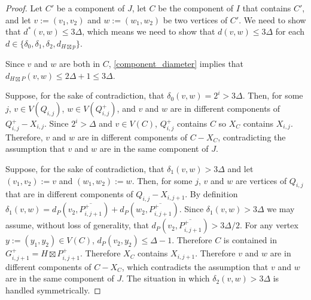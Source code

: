\documentclass{patmorin}
\renewcommand{\le}{\leqslant}
\begin{document}
\begin{proof}
  Let $C'$ be a component of $J$, let $C$ be the component of $I$ that contains $C'$, and let $v:=(v_1,v_2)$ and $w:=(w_1,w_2)$ be two vertices of $C'$. We need to show that $d^*(v,w)\le 3\Delta$, which means we need to show that $d(v,w)\le 3\Delta$ for each $d\in\{\delta_0, \delta_1,\delta_2,d_{H\boxtimes p}\}$.

  Since $v$ and $w$ are both in $C$, \cref{component_diameter} implies that $d_{H\boxtimes P}(v,w)\le 2\Delta+1 \le 3\Delta$.

  Suppose, for the sake of contradiction, that $\delta_0(v,w)=2^i> 3\Delta$. Then, for some $j$, $v\in V(Q_{i,j})$,  $w\in V(Q^+_{i,j})$, and $v$ and $w$ are in different components of $Q^+_{i,j}-X_{i,j}$.  Since $2^i>\Delta$ and $v\in V(C)$, $Q^+_{i,j}$ contains $C$ so $X_C$ contains $X_{i,j}$. Therefore, $v$ and $w$ are in different components of $C-X_C$, contradicting the assumption that $v$ and $w$ are in the same component of $J$.

  Suppose, for the sake of contradiction, that $\delta_1(v,w)>3\Delta$ and let $(v_1,v_2):=v$ and $(w_1,w_2):=w$.  Then, for some $j$, $v$ and $w$ are vertices of $Q_{i,j}$ that are in different components of $Q_{i,j}-X_{i,j+1}$.  By definition $\delta_1(v,w)=d_P\left(v_2,\overline{P^+_{i,j+1}}\right) + d_P\left(w_2,\overline{P^+_{i,j+1}}\right)$.  Since $\delta_1(v,w)>3\Delta$ we may assume, without loss of generality, that $d_P\left(v_2,\overline{P^+_{i,j+1}}\right)>3\Delta/2$.  For any vertex $y:=(y_1,y_2)\in V(C)$, $d_P(v_2,y_2)\le\Delta-1$.  Therefore $C$ is contained in $G^+_{i,j+1}=H\boxtimes P^+_{i,j+1}$.  Therefore $X_C$ contains $X_{i,j+1}$.  Therefore $v$ and $w$ are in different components of $C-X_C$, which contradicts the assumption that $v$ and $w$ are in the same component of $J$.
  The situation in which $\delta_2(v,w)>3\Delta$ is handled symmetrically.
\end{proof}
\end{document}
